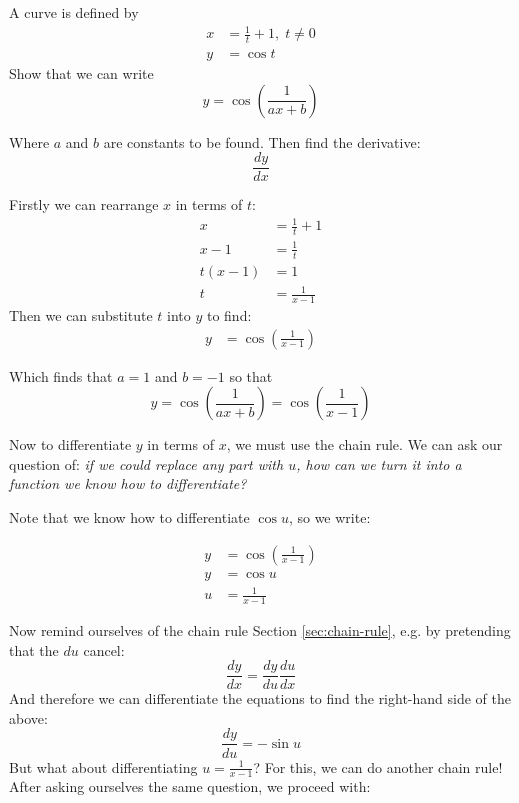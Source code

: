 \begin{example}
    A curve is defined by 
    \begin{align*}
        x &= \frac{1}{t} + 1, \; t\neq0\\
        y &= \cos t
    \end{align*}
    Show that we can write 
    \[ y = \cos\left(\frac{1}{ax + b}\right)\]

    Where $a$ and $b$ are constants to be found. Then find the derivative:
    \[ \frac{dy}{dx} \]
\end{example}

\begin{solution}
    Firstly we can rearrange $x$ in terms of $t$:
    \begin{align*}
        x &= \frac{1}{t} + 1 \\
        x -1 &= \frac{1}{t} \\
        t(x-1) &= 1 \\
        t &= \frac{1}{x-1} \tag{as long as $x\neq 1$}
    \end{align*}
    Then we can substitute $t$ into $y$ to find:
    \begin{align*}
     y &= \cos\left(\frac{1}{x-1} \right) 
    \end{align*}

    Which finds that $a=1$ and $b=-1$ so that 
    \[ y = \cos\left(\frac{1}{ax + b}\right)= \cos\left(\frac{1}{x-1}\right)\]

    Now to differentiate $y$ in terms of $x$, we must use the chain rule. We can ask our question of: \emph{if we could replace any part with $u$, how can we turn it into a function we know how to differentiate?}

    Note that we know how to differentiate $\cos u$, so we write:

    \begin{align*}
        y &= \cos\left(\frac{1}{x-1}\right) \\
        y &= \cos u \tag{what we want} \\
        u &= \frac{1}{x-1} \tag{to get what we want}
    \end{align*}

    Now remind ourselves of the chain rule Section \ref{sec:chain-rule}, e.g. by pretending that the $du$ cancel:
    \[ \frac{dy}{dx} = \frac{dy }{du}\frac{du }{dx}\]
    And therefore we can differentiate the equations to find the right-hand side of the above:
    \[ \frac{dy }{du} = -\sin u\]
    But what about differentiating $ u = \frac{1}{x-1}$? For this, we can do another chain rule! After asking ourselves the same question, we proceed with:


\end{solution}
